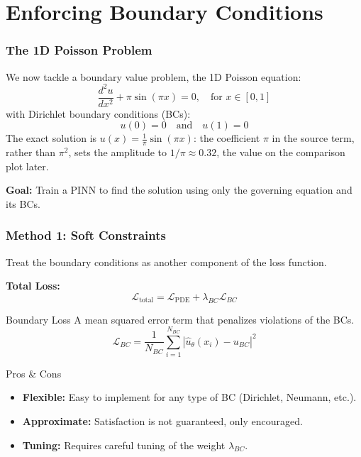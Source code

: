 \documentclass[notes]{beamer}
\begin{document}
\section{Enforcing Boundary Conditions}

\begin{frame}
\frametitle{The 1D Poisson Problem}

We now tackle a boundary value problem, the 1D Poisson equation:
\begin{equation*}
\frac{d^2u}{dx^2} + \pi \sin(\pi x) = 0, \quad \text{for } x \in [0, 1]
\end{equation*}
with Dirichlet boundary conditions (BCs):
\begin{equation*}
u(0) = 0 \quad \text{and} \quad u(1) = 0
\end{equation*}
The exact solution is $u(x) = \frac{1}{\pi}\sin(\pi x)$: the coefficient $\pi$ in the source term, rather than $\pi^2$, sets the amplitude to $1/\pi \approx 0.32$, the value on the comparison plot later.

\textbf{Goal:} Train a PINN to find the solution using only the governing equation and its BCs.

\end{frame}

\begin{frame}
\frametitle{Method 1: Soft Constraints}

Treat the boundary conditions as another component of the loss function.

\textbf{Total Loss:}
\begin{equation*}
\mathcal{L}_{\text{total}} = \mathcal{L}_{\text{PDE}} + \lambda_{BC} \mathcal{L}_{BC}
\end{equation*}

\begin{block}{Boundary Loss}
A mean squared error term that penalizes violations of the BCs.
\begin{equation*}
\mathcal{L}_{BC} = \frac{1}{N_{BC}} \sum_{i=1}^{N_{BC}} |\hat{u}_\theta(x_i) - u_{BC}|^2
\end{equation*}
\end{block}

\begin{alertblock}{Pros \& Cons}
\begin{itemize}
    \item[+]\textbf{Flexible:} Easy to implement for any type of BC (Dirichlet, Neumann, etc.).
    \item[-]\textbf{Approximate:} Satisfaction is not guaranteed, only encouraged.
    \item[-]\textbf{Tuning:} Requires careful tuning of the weight $\lambda_{BC}$.
\end{itemize}
\end{alertblock}

\end{frame}
\end{document}
